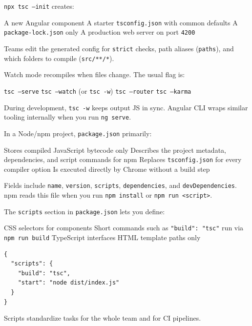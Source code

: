 \question[4]
\texttt{npx tsc --init} creates:
\begin{choices}
  \choice A new Angular component
  \CorrectChoice A starter \texttt{tsconfig.json} with common defaults
  \choice A \texttt{package-lock.json} only
  \choice A production web server on port \texttt{4200}
\end{choices}
\begin{solution}
  Teams edit the generated config for \texttt{strict} checks, path aliases (\texttt{paths}), and which folders to compile (\texttt{src/**/*}).
\end{solution}

\question[4]
Watch mode recompiles when files change. The usual flag is:
\begin{choices}
  \choice \texttt{tsc --serve}
  \CorrectChoice \texttt{tsc --watch} (or \texttt{tsc -w})
  \choice \texttt{tsc --router}
  \choice \texttt{tsc --karma}
\end{choices}
\begin{solution}
  During development, \texttt{tsc -w} keeps output JS in sync. Angular CLI wraps similar tooling internally when you run \texttt{ng serve}.
\end{solution}

\question[4]
In a Node/npm project, \texttt{package.json} primarily:
\begin{choices}
  \choice Stores compiled JavaScript bytecode only
  \CorrectChoice Describes the project metadata, dependencies, and script commands for npm
  \choice Replaces \texttt{tsconfig.json} for every compiler option
  \choice Is executed directly by Chrome without a build step
\end{choices}
\begin{solution}
  Fields include \texttt{name}, \texttt{version}, \texttt{scripts}, \texttt{dependencies}, and \texttt{devDependencies}. npm reads this file when you run \texttt{npm install} or \texttt{npm run <script>}.
\end{solution}

\question[4]
The \texttt{scripts} section in \texttt{package.json} lets you define:
\begin{choices}
  \choice CSS selectors for components
  \CorrectChoice Short commands such as \texttt{"build": "tsc"} run via \texttt{npm run build}
  \choice TypeScript interfaces
  \choice HTML template paths only
\end{choices}
\begin{solution}
\begin{lstlisting}[style=json]
{
  "scripts": {
    "build": "tsc",
    "start": "node dist/index.js"
  }
}
\end{lstlisting}
  Scripts standardize tasks for the whole team and for CI pipelines.
\end{solution}

